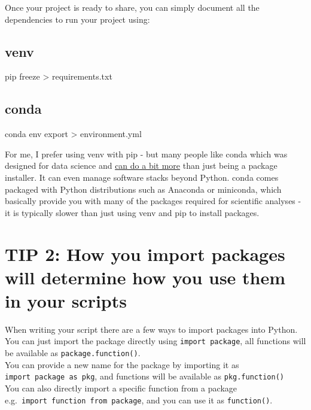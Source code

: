 \documentclass[
  letterpaper,
  DIV=11,
  numbers=noendperiod]{scrartcl}
\newenvironment{Shaded}{\begin{snugshade}}{\end{snugshade}}
\newcommand{\ExtensionTok}[1]{\textcolor[rgb]{0.00,0.23,0.31}{#1}}
\newcommand{\NormalTok}[1]{\textcolor[rgb]{0.00,0.23,0.31}{#1}}
\newcommand{\OperatorTok}[1]{\textcolor[rgb]{0.37,0.37,0.37}{#1}}
\begin{document}
Once your project is ready to share, you can simply document all the
dependencies to run your project using:

\subsection{venv}

\begin{Shaded}
\begin{Highlighting}[]
\ExtensionTok{pip}\NormalTok{ freeze }\OperatorTok{\textgreater{}}\NormalTok{ requirements.txt}
\end{Highlighting}
\end{Shaded}

\subsection{conda}

\begin{Shaded}
\begin{Highlighting}[]
\ExtensionTok{conda}\NormalTok{ env export }\OperatorTok{\textgreater{}}\NormalTok{ environment.yml}
\end{Highlighting}
\end{Shaded}

For me, I prefer using venv with pip - but many people like conda which
was designed for data science and
\href{https://jakevdp.github.io/blog/2016/08/25/conda-myths-and-misconceptions/}{can
do a bit more} than just being a package installer. It can even manage
software stacks beyond Python. conda comes packaged with Python
distributions such as Anaconda or miniconda, which basically provide you
with many of the packages required for scientific analyses - it is
typically slower than just using venv and pip to install packages.

\section{TIP 2: How you import packages will determine how you use them
in your
scripts}\label{tip-2-how-you-import-packages-will-determine-how-you-use-them-in-your-scripts}

When writing your script there are a few ways to import packages into
Python.\\
You can just import the package directly using \texttt{import\ package},
all functions will be available as \texttt{package.function()}.\\
You can provide a new name for the package by importing it as
\texttt{import\ package\ as\ pkg}, and functions will be available as
\texttt{pkg.function()}\\
You can also directly import a specific function from a package
e.g.~\texttt{import\ function\ from\ package}, and you can use it as
\texttt{function()}.
\end{document}
